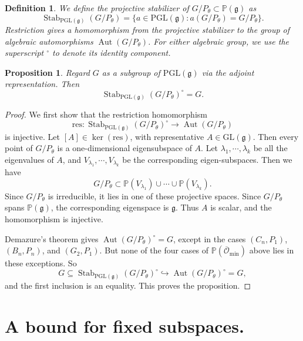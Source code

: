 \documentclass[10pt,a4paper]{amsart}
\newtheorem{proposition}[theorem]{Proposition}
\newtheorem{definition}[theorem]{Definition}
\DeclareMathOperator{\Aut}{Aut}
\DeclareMathOperator{\Stab}{Stab}
\newcommand{\res}{\mathrm{res}}
\newcommand{\GL}{\mathrm{GL}}
\newcommand{\PGL}{\mathrm{PGL}}
\newcommand{\PP}{\mathbb P}
\newcommand{\Lieg}{\mathfrak{g}}
\newcommand{\Ominbar}{\overline{\mathcal O}_{\min}}
\begin{document}
\begin{definition}
  We define the \emph{projective stabilizer} of $G/P_\theta\subset\PP(\Lieg)$ as 
    \[
        \Stab_{\PGL(\Lieg)}(G/P_\theta)
        =\{a\in\PGL(\Lieg):a(G/P_\theta)=G/P_\theta\}.
    \]
    Restriction gives a homomorphism from the projective stabilizer to the group of algebraic automorphisms $\Aut(G/P_\theta)$.
    For either algebraic group, we use the superscript ${}^\circ$ to denote its identity component.
\end{definition}

\begin{proposition}\label{projectivestabilizer}
    Regard $G$ as a subgroup of $\PGL(\Lieg)$ via the adjoint representation. Then $$\Stab_{\PGL(\Lieg)}(G/P_\theta)^\circ=G.$$
\end{proposition}
\begin{proof}


    We first show that the restriction homomorphism $$\res:\Stab_{\PGL(\Lieg)}(G/P_\theta)^\circ\rightarrow\Aut(G/P_\theta)$$ is injective. Let $[A]\in\ker(\res)$, with representative $A\in\GL(\Lieg)$. Then every point of $G/P_\theta$ is a one-dimensional eigensubspace of $A$. Let $\lambda_1,\cdots,\lambda_k$ be all the eigenvalues of $A$, and $V_{\lambda_1},\cdots,V_{\lambda_k}$ be the corresponding eigen-subspaces. Then we have $$G/P_\theta\subset\PP(V_{\lambda_1})\cup\cdots\cup\PP(V_{\lambda_k}).$$
    Since $G/P_\theta$ is irreducible, it lies in one of these projective spaces. Since $G/P_\theta$ spans $\PP(\Lieg)$, the corresponding eigenspace is $\Lieg$. Thus $A$ is scalar, and the homomorphism is injective.

    Demazure's theorem  \cite[pp.~181--182, Th\'eor\`eme~1]{Demazure} gives $\Aut(G/P_\theta)^\circ=G$, except in the cases $(C_n,P_1)$, $(B_n,P_n)$, and $(G_2,P_1)$. But none of the four cases of $\PP(\Ominbar)$ above lies in these exceptions.
So
    \[
        G\subseteq
        \Stab_{\PGL(\Lieg)}(G/P_\theta)^\circ
        \hookrightarrow\Aut(G/P_\theta)^\circ=G,
    \]
    and the first inclusion is an equality. This proves the proposition.
\end{proof}

\section{A bound for fixed subspaces.}\label{fixedbound}
\end{document}
